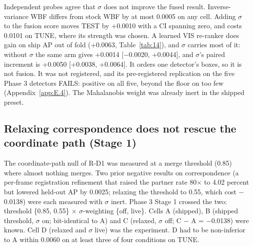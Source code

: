 \documentclass[10pt]{article}
\begin{document}
Independent probes agree that $\sigma$ does not improve the fused result. Inverse-variance WBF differs from stock WBF by at most 0.0005 on any cell. Adding $\sigma$ to the fusion score moves TEST by +0.0010 with a CI spanning zero, and costs 0.0101 on TUNE, where its strength was chosen. A learned VIS re-ranker does gain on ship AP out of fold (+0.0063, Table~\ref{tab:14}), and $\sigma$ carries most of it: without $\sigma$ the same arm gives +0.0014 [$-$0.0020, +0.0044], and $\sigma$'s paired increment is +0.0050 [+0.0038, +0.0064]. It orders one detector's boxes, so it is not fusion. It was not registered, and its pre-registered replication on the five Phase 3 detectors FAILS: positive on all five, beyond the floor on too few (Appendix~\ref{app:E.4}). The Mahalanobis weight was already inert in the shipped preset.

\subsection{Relaxing correspondence does not rescue the coordinate path (Stage 1)}\label{app:E.3}
The coordinate-path null of R-D1 was measured at a merge threshold (0.85) where almost nothing merges. Two prior negative results on correspondence (a per-frame registration refinement that raised the partner rate 80$\times$ to 4.02 percent but lowered held-out AP by 0.0025; relaxing the threshold to 0.55, which cost $-$0.0138) were each measured with $\sigma$ inert. Phase 3 Stage 1 crossed the two: threshold \{0.85, 0.55\} $\times$ $\sigma$-weighting \{off, live\}. Cells A (shipped), B (shipped threshold, $\sigma$ on; bit-identical to A) and C (relaxed, $\sigma$ off; C $-$ A = $-$0.0138) were known. Cell D (relaxed and $\sigma$ live) was the experiment. D had to be non-inferior to A within 0.0060 on at least three of four conditions on TUNE.
\end{document}
